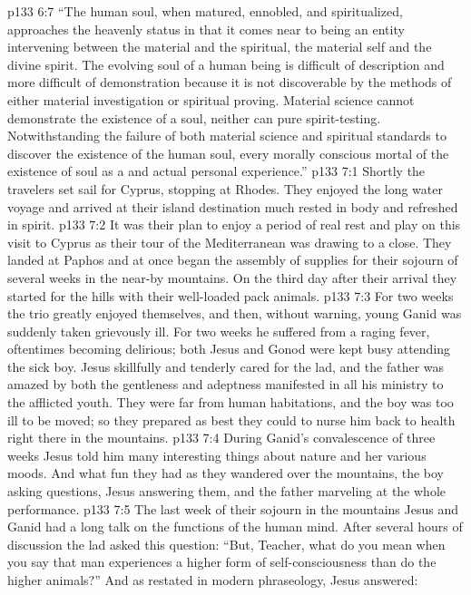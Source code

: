\vs p133 6:7 \textcolor{ubdarkred}{“The human soul, when matured, ennobled, and spiritualized, approaches the heavenly status in that it comes near to being an entity intervening between the material and the spiritual, the material self and the divine spirit. The evolving soul of a human being is difficult of description and more difficult of demonstration because it is not discoverable by the methods of either material investigation or spiritual proving. Material science cannot demonstrate the existence of a soul, neither can pure spirit\hyp{}testing. Notwithstanding the failure of both material science and spiritual standards to discover the existence of the human soul, every morally conscious mortal  of the existence of  soul as a  and actual personal experience.”}
\vs p133 7:1 Shortly the travelers set sail for Cyprus, stopping at Rhodes. They enjoyed the long water voyage and arrived at their island destination much rested in body and refreshed in spirit.
\vs p133 7:2 It was their plan to enjoy a period of real rest and play on this visit to Cyprus as their tour of the Mediterranean was drawing to a close. They landed at Paphos and at once began the assembly of supplies for their sojourn of several weeks in the near\hyp{}by mountains. On the third day after their arrival they started for the hills with their well\hyp{}loaded pack animals.
\vs p133 7:3 For two weeks the trio greatly enjoyed themselves, and then, without warning, young Ganid was suddenly taken grievously ill. For two weeks he suffered from a raging fever, oftentimes becoming delirious; both Jesus and Gonod were kept busy attending the sick boy. Jesus skillfully and tenderly cared for the lad, and the father was amazed by both the gentleness and adeptness manifested in all his ministry to the afflicted youth. They were far from human habitations, and the boy was too ill to be moved; so they prepared as best they could to nurse him back to health right there in the mountains.
\vs p133 7:4 During Ganid’s convalescence of three weeks Jesus told him many interesting things about nature and her various moods. And what fun they had as they wandered over the mountains, the boy asking questions, Jesus answering them, and the father marveling at the whole performance.
\vs p133 7:5 The last week of their sojourn in the mountains Jesus and Ganid had a long talk on the functions of the human mind. After several hours of discussion the lad asked this question: “But, Teacher, what do you mean when you say that man experiences a higher form of self\hyp{}consciousness than do the higher animals?” And as restated in modern phraseology, Jesus answered:
